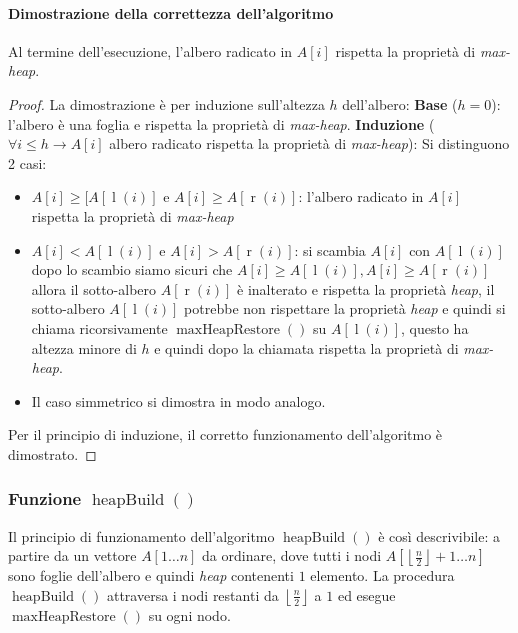             \paragraph{Dimostrazione della correttezza dell'algoritmo}
                \begin{theorem}
                    Al termine dell'esecuzione, l'albero radicato in $A[i]$ rispetta la proprietà di \textit{max-heap}.
                \end{theorem}
                \begin{proof}
                    La dimostrazione è per induzione sull'altezza $h$ dell'albero:\newline
                    \textbf{Base} ($h=0$): l'albero è una foglia e rispetta la proprietà di \textit{max-heap}.\newline
                    \textbf{Induzione} ($\forall i\leq h \rightarrow A[i]$ albero radicato rispetta la proprietà di \textit{max-heap}): Si distinguono 2 casi:
                    \begin{itemize}
                        \item $A[i]\geq [A[\operatorname{l}(i)]$ e $A[i]\geq A[\operatorname{r}(i)]$: l'albero radicato in $A[i]$ rispetta la proprietà di \textit{max-heap}
                        \item $A[i] < A[\operatorname{l}(i)]$ e $A[i] > A[\operatorname{r}(i)]$: si scambia $A[i]$ con $A[\operatorname{l}(i)]$ dopo lo scambio siamo sicuri che $A[i] \geq A[\operatorname{l}(i)], A[i] \geq A[\operatorname{r}(i)]$ allora il sotto-albero $A[\operatorname{r}(i)]$ è inalterato e rispetta la proprietà \textit{heap}, il sotto-albero $A[\operatorname{l}(i)]$ potrebbe non rispettare la proprietà \textit{heap} e quindi si chiama ricorsivamente $\operatorname{maxHeapRestore}()$ su $A[\operatorname{l}(i)]$, questo ha altezza minore di $h$ e quindi dopo la chiamata rispetta la proprietà di \textit{max-heap}.
                        \item Il caso simmetrico si dimostra in modo analogo.
                    \end{itemize}
                    Per il principio di induzione, il corretto funzionamento dell'algoritmo è dimostrato.
                \end{proof}
        \subsubsection{Funzione $\operatorname{heapBuild}()$}
            Il principio di funzionamento dell'algoritmo $\operatorname{heapBuild}()$ è così descrivibile: a partire da un vettore $A[1\dots n]$ da ordinare, dove tutti i nodi $A\left[\left\lfloor \frac{n}2 \right\rfloor+1\dots n\right]$ sono foglie dell'albero e quindi \textit{heap} contenenti $1$ elemento. La procedura $\operatorname{heapBuild}()$ attraversa i nodi restanti da $\left\lfloor \frac{n}2 \right\rfloor$ a $1$ ed esegue $\operatorname{maxHeapRestore}()$ su ogni nodo.
            
